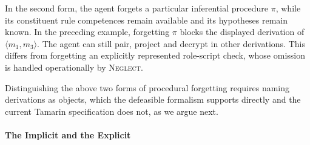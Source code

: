 In the second form, the agent forgets a particular inferential procedure $\pi$, while its constituent rule competences remain available and its hypotheses remain known. In the preceding example, forgetting $\pi$ blocks the displayed derivation of $\langle m_1,m_3 \rangle$. The agent can still pair, project and decrypt in other derivations. This differs from forgetting an explicitly represented role-script check, whose omission is handled operationally by \textsc{Neglect}.

Distinguishing the above two forms of procedural forgetting requires naming derivations as objects, which the defeasible formalism supports directly and the current Tamarin specification does not, as we argue next.

\paragraph{The Implicit and the Explicit}

